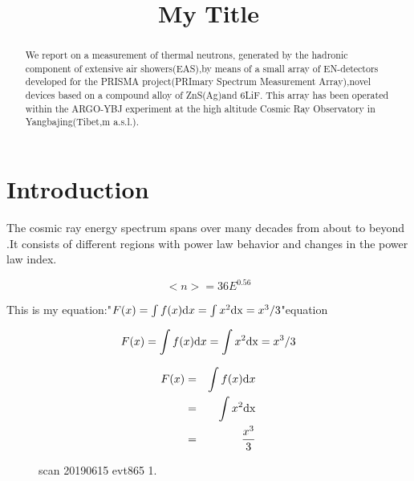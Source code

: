 \documentclass{aastex62}
\begin{document}
\title{My Title}

\begin{abstract}
We report on a measurement of thermal neutrons, generated by the hadronic component of extensive air showers(EAS),by means of a small array of EN-detectors developed for the PRISMA project(PRImary Spectrum Measurement Array),novel devices based on a compound alloy of ZnS(Ag)and 6LiF. This array has been operated within the ARGO-YBJ experiment at the high altitude Cosmic Ray Observatory in Yangbajing(Tibet,m a.s.l.). 
\end{abstract}


\section{Introduction}

The cosmic ray energy spectrum spans over many decades from about to beyond .It consists of different regions with power law behavior and changes in the power law index.


\begin{equation}
<n>=36 E^{0.56}
\end{equation}

This is my equation:"$F(x)=\int f(x) {\rm d}x = \int x^2 {\rm d x}=x^3/3$"equation

\begin{equation}
F(x)= \int f(x) {\rm d}x = \int x^2 {\rm d x}=x^3/3
\end{equation}

\begin{eqnarray}
F(x) &=&\int f(x) {\rm d}x \\
&=& \int x^2 {\rm d x} \nonumber\\
&=&x^3 \over 3
\end{eqnarray}


\begin{figure}[ht!]
\caption{scan 20190615 evt865 1.}
\end{figure}
\end{document}
